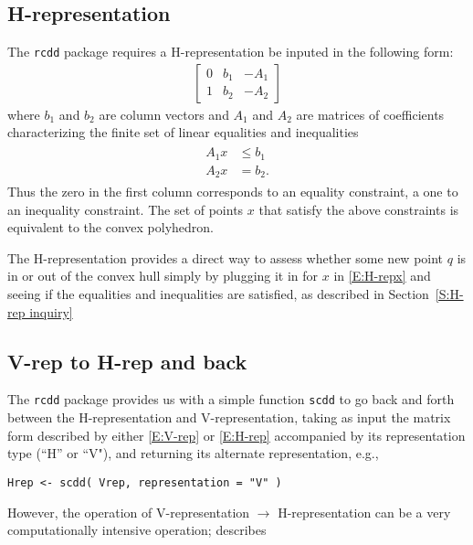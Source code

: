 \subsection{H-representation} \label{S:H-rep}
The \texttt{rcdd} package requires a H-representation be inputed in the following form:
\begin{align} \label{E:H-rep}
	\left[\begin{array}{ccc}	0 & b_1 & -A_1 \\ 1 & b_2 & -A_2
	\end{array}\right]
\end{align}
where $b_1$ and $b_2$ are column vectors and $A_1$ and $A_2$ are matrices 
of coefficients characterizing the finite set of 
linear equalities and inequalities
\begin{align} \label{E:H-repx}
\begin{split}
	A_1 x &\leq b_1 \\
	A_2 x &= b_2.
\end{split}
\end{align}
Thus the zero in the first column corresponds to an equality constraint, a one to
an inequality constraint.
The set of points $x$ that satisfy the above constraints is equivalent to the
convex polyhedron.

The H-representation provides a direct
way to assess whether some new point $q$ is in or out of the convex hull
simply by plugging it in for $x$ in \eqref{E:H-repx} and seeing if the equalities
and inequalities are satisfied, as described in Section~\ref{S:H-rep inquiry}

\subsection{V-rep to H-rep and back}
The \texttt{rcdd} package provides us with a simple function \texttt{scdd}
to go back and forth between the H-representation and V-representation, taking as input
the matrix form described by either \eqref{E:V-rep} or \eqref{E:H-rep} accompanied
by its representation type (``H'' or ``V"), and returning its alternate representation, e.g.,
\begin{verbatim}
Hrep <- scdd( Vrep, representation = "V" )
\end{verbatim}

However, the operation of V-representation $\rightarrow$ H-representation 
can be a very computationally intensive operation; \citet{Geyer:2009} describes


